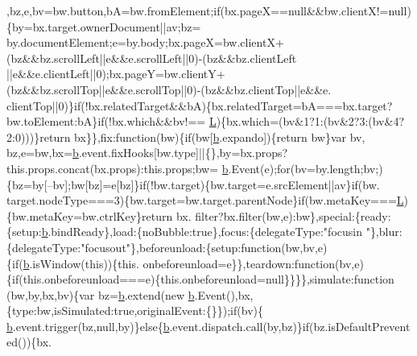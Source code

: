 \begin{DoxyCode}
      ,bz,e,bv=bw.button,bA=bw.fromElement;\textcolor{keywordflow}{if}(bx.pageX==null&&bw.clientX!=null)\{by=bx.target.ownerDocument||av;bz=
      by.documentElement;e=by.body;bx.pageX=bw.clientX+(bz&&bz.scrollLeft||e&&e.scrollLeft||0)-(bz&&bz.clientLeft
      ||e&&e.clientLeft||0);bx.pageY=bw.clientY+(bz&&bz.scrollTop||e&&e.scrollTop||0)-(bz&&bz.clientTop||e&&e.
      clientTop||0)\}\textcolor{keywordflow}{if}(!bx.relatedTarget&&bA)\{bx.relatedTarget=bA===bx.target?bw.toElement:bA\}\textcolor{keywordflow}{if}(!bx.which&&bv!==
      \hyperlink{a00039_a38ee4c0b5f4fe2a18d0c783af540d253}{L})\{bx.which=(bv&1?1:(bv&2?3:(bv&4?2:0)))\}\textcolor{keywordflow}{return} bx\}\},fix:\textcolor{keyword}{function}(bw)\{\textcolor{keywordflow}{if}(bw[\hyperlink{a00039_aa4026ad5544b958e54ce5e106fa1c805}{b}.expando])\{\textcolor{keywordflow}{return} bw\}var bv,
      bz,e=bw,bx=\hyperlink{a00039_aa4026ad5544b958e54ce5e106fa1c805}{b}.event.fixHooks[bw.type]||\{\},by=bx.props?this.props.concat(bx.props):this.props;bw=
      \hyperlink{a00039_aa4026ad5544b958e54ce5e106fa1c805}{b}.Event(e);\textcolor{keywordflow}{for}(bv=by.length;bv;)\{bz=by[--bv];bw[bz]=e[bz]\}\textcolor{keywordflow}{if}(!bw.target)\{bw.target=e.srcElement||av\}\textcolor{keywordflow}{if}(bw.
      target.nodeType===3)\{bw.target=bw.target.parentNode\}\textcolor{keywordflow}{if}(bw.metaKey===\hyperlink{a00039_a38ee4c0b5f4fe2a18d0c783af540d253}{L})\{bw.metaKey=bw.ctrlKey\}\textcolor{keywordflow}{return} bx.
      filter?bx.filter(bw,e):bw\},special:\{ready:\{setup:\hyperlink{a00039_aa4026ad5544b958e54ce5e106fa1c805}{b}.bindReady\},load:\{noBubble:\textcolor{keyword}{true}\},focus:\{delegateType:\textcolor{stringliteral}{"focusin
      "}\},blur:\{delegateType:\textcolor{stringliteral}{"focusout"}\},beforeunload:\{setup:\textcolor{keyword}{function}(bw,bv,e)\{\textcolor{keywordflow}{if}(\hyperlink{a00039_aa4026ad5544b958e54ce5e106fa1c805}{b}.isWindow(\textcolor{keyword}{this}))\{this.
      onbeforeunload=e\}\},teardown:\textcolor{keyword}{function}(bv,e)\{\textcolor{keywordflow}{if}(this.onbeforeunload===e)\{this.onbeforeunload=null\}\}\}\},simulate:\textcolor{keyword}{function}
      (bw,by,bx,bv)\{var bz=\hyperlink{a00039_aa4026ad5544b958e54ce5e106fa1c805}{b}.extend(\textcolor{keyword}{new} \hyperlink{a00039_aa4026ad5544b958e54ce5e106fa1c805}{b}.Event(),bx,\{type:bw,isSimulated:\textcolor{keyword}{true},originalEvent:\{\}\});\textcolor{keywordflow}{if}(bv)\{
      \hyperlink{a00039_aa4026ad5544b958e54ce5e106fa1c805}{b}.event.trigger(bz,null,by)\}\textcolor{keywordflow}{else}\{\hyperlink{a00039_aa4026ad5544b958e54ce5e106fa1c805}{b}.event.dispatch.call(by,bz)\}\textcolor{keywordflow}{if}(bz.isDefaultPrevented())\{bx.

\end{DoxyCode}
